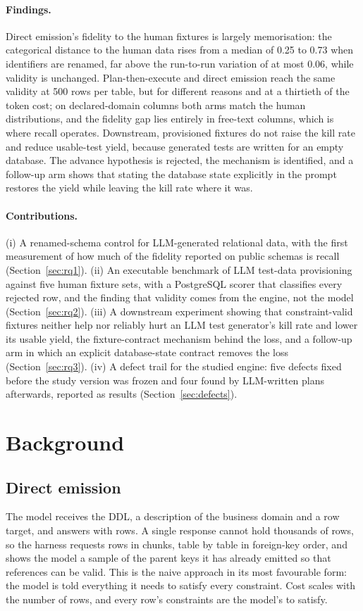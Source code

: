 \documentclass[preprint,12pt]{elsarticle}
\begin{document}
\paragraph{Findings.} Direct emission's fidelity to the human fixtures is largely memorisation: the categorical distance to the human data rises from a median of 0.25 to 0.73 when identifiers are renamed, far above the run-to-run variation of at most 0.06, while validity is unchanged. Plan-then-execute and direct emission reach the same validity at 500 rows per table, but for different reasons and at a thirtieth of the token cost; on declared-domain columns both arms match the human distributions, and the fidelity gap lies entirely in free-text columns, which is where recall operates. Downstream, provisioned fixtures do not raise the kill rate and reduce usable-test yield, because generated tests are written for an empty database. The advance hypothesis is rejected, the mechanism is identified, and a follow-up arm shows that stating the database state explicitly in the prompt restores the yield while leaving the kill rate where it was.

\paragraph{Contributions.}
(i) A renamed-schema control for LLM-generated relational data, with the first measurement of how much of the fidelity reported on public schemas is recall (Section~\ref{sec:rq1}).
(ii) An executable benchmark of LLM test-data provisioning against five human fixture sets, with a PostgreSQL scorer that classifies every rejected row, and the finding that validity comes from the engine, not the model (Section~\ref{sec:rq2}).
(iii) A downstream experiment showing that constraint-valid fixtures neither help nor reliably hurt an LLM test generator's kill rate and lower its usable yield, the fixture-contract mechanism behind the loss, and a follow-up arm in which an explicit database-state contract removes the loss (Section~\ref{sec:rq3}).
(iv) A defect trail for the studied engine: five defects fixed before the study version was frozen and four found by LLM-written plans afterwards, reported as results (Section~\ref{sec:defects}).

\section{Background}
\label{sec:background}

\subsection{Direct emission}
The model receives the DDL, a description of the business domain and a row target, and answers with rows. A single response cannot hold thousands of rows, so the harness requests rows in chunks, table by table in foreign-key order, and shows the model a sample of the parent keys it has already emitted so that references can be valid. This is the naive approach in its most favourable form: the model is told everything it needs to satisfy every constraint. Cost scales with the number of rows, and every row's constraints are the model's to satisfy.
\end{document}
